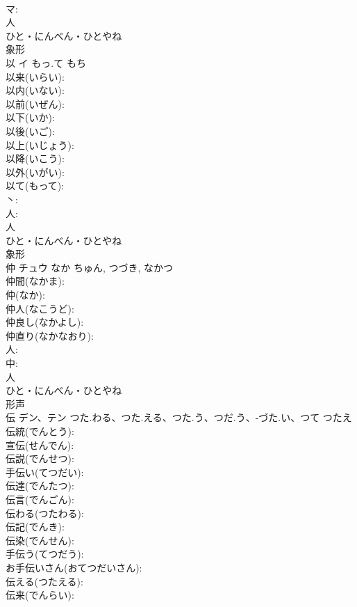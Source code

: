 \documentclass[8pt]{extreport}
\begin{document}
\begin{CJK}{UTF8}{min}
\\	マ: 
\\	人	
\\	ひと・にんべん・ひとやね	
\\	象形 
\\	以	イ	もっ.て	もち	
\\	以来(いらい): 
\\	以内(いない): 
\\	以前(いぜん): 
\\	以下(いか): 
\\	以後(いご): 
\\	以上(いじょう): 
\\	以降(いこう): 
\\	以外(いがい): 
\\	以て(もって): 
\\	丶: 
\\	人: 
\\	人	
\\	ひと・にんべん・ひとやね	
\\	象形 
\\	仲	チュウ	なか	ちゅん, つづき, なかつ	
\\	仲間(なかま): 
\\	仲(なか): 
\\	仲人(なこうど): 
\\	仲良し(なかよし): 
\\	仲直り(なかなおり): 
\\	人: 
\\	中: 
\\	人	
\\	ひと・にんべん・ひとやね	
\\	形声 
\\	伝	デン、テン	つた.わる、つた.える、つた.う、つだ.う、-づた.い、つて	つたえ	
\\	伝統(でんとう): 
\\	宣伝(せんでん): 
\\	伝説(でんせつ): 
\\	手伝い(てつだい): 
\\	伝達(でんたつ): 
\\	伝言(でんごん): 
\\	伝わる(つたわる): 
\\	伝記(でんき): 
\\	伝染(でんせん): 
\\	手伝う(てつだう): 
\\	お手伝いさん(おてつだいさん): 
\\	伝える(つたえる): 
\\	伝来(でんらい): 

\end{CJK}
\end{document}
